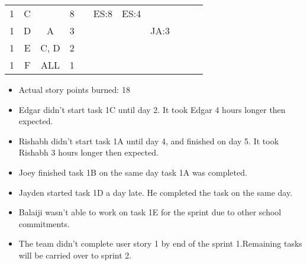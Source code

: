 \documentclass[12pt]{article}
\begin{document}
\begin{table}[H]
\begin{tabular}{@{}l|c|c|c|ccccccc@{}}
1     & C    &            & 8                                                      &                                                 & ES:8                                            & ES:4                                            &                                                 &                                                 &                                                 &                                                 \\
1     & D    & A          & 3                                                      &                                                 &                                                 &                                                 & JA:3                                            &                                                 &                                                 &                                                 \\
1     & E    & C, D       & 2                                                      &                                                 &                                                 &                                                 &                                                 &                                                 &                                                 &                                                 \\
1     & F    & ALL        & 1                                                      &                                                 &                                                 &                                                 &                                                 &                                                 &                                                 &                                                 \\ \bottomrule
\end{tabular}
\end{table}

\begin{itemize}%
\item Actual story points burned: 18
\item Edgar didn't start task 1C until day 2.  It took Edgar 4 hours longer then expected. 
\item Rishabh didn't start task 1A until day 4, and finished on day 5. It took Rishabh 3 hours longer then expected. 
\item Joey finished task 1B on the same day task 1A was completed.
\item Jayden started task 1D a day late. He completed the task on the same day.
\item Balaiji wasn't able to work on task 1E for the sprint due to other school commitments.
\item The team didn't complete user story 1 by end of the sprint 1.Remaining tasks will be carried over to sprint 2. 
\end{itemize}
\end{document}
